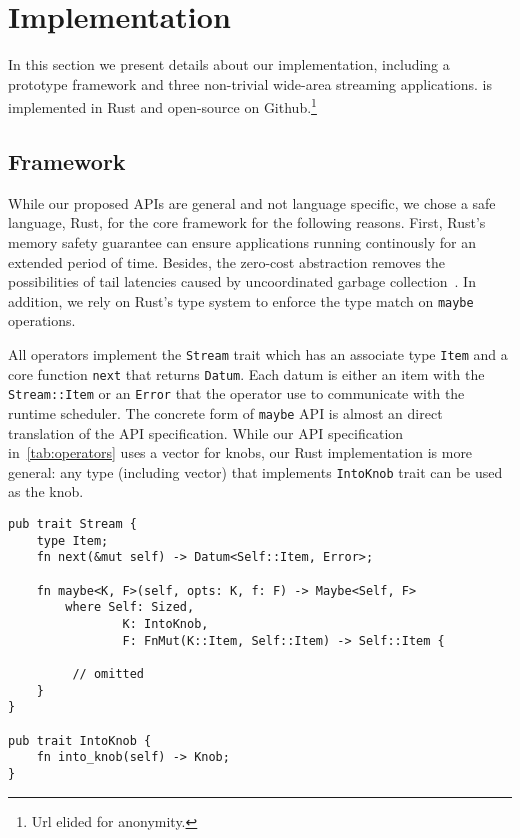 \section{Implementation}
\label{sec:implementation}

In this section we present details about our implementation, including a
prototype framework and three non-trivial wide-area streaming applications.
\sysname{} is implemented in Rust and open-source on Github.\footnote{Url elided
  for anonymity.}

\subsection{Framework}
\label{sec:framework}

While our proposed APIs are general and not language specific, we chose a safe
language, Rust, for the core framework for the following reasons. First, Rust's
memory safety guarantee can ensure applications running continously for an
extended period of time. Besides, the zero-cost abstraction removes the
possibilities of tail latencies caused by uncoordinated garbage
collection~\cite{maas2016taurus}. In addition, we rely on Rust's type system to
enforce the type match on \texttt{maybe} operations.

\begin{sloppypar}
All operators implement the \texttt{Stream} trait which has an associate type
\texttt{Item} and a core function \texttt{next} that returns
\texttt{Datum}. Each datum is either an item with the \texttt{Stream::Item} or
an \texttt{Error} that the operator use to communicate with the runtime
scheduler. The concrete form of \texttt{maybe} API is almost an direct
translation of the API specification. While our API specification
in~\autoref{tab:operators} uses a vector for knobs, our Rust implementation is
more general: any type (including vector) that implements \texttt{IntoKnob}
trait can be used as the knob.
\end{sloppypar}

\begin{lstlisting}
pub trait Stream {
    type Item;
    fn next(&mut self) -> Datum<Self::Item, Error>;

    fn maybe<K, F>(self, opts: K, f: F) -> Maybe<Self, F>
        where Self: Sized,
                K: IntoKnob,
                F: FnMut(K::Item, Self::Item) -> Self::Item {

         // omitted
    }
}

pub trait IntoKnob {
    fn into_knob(self) -> Knob;
}
\end{lstlisting}

